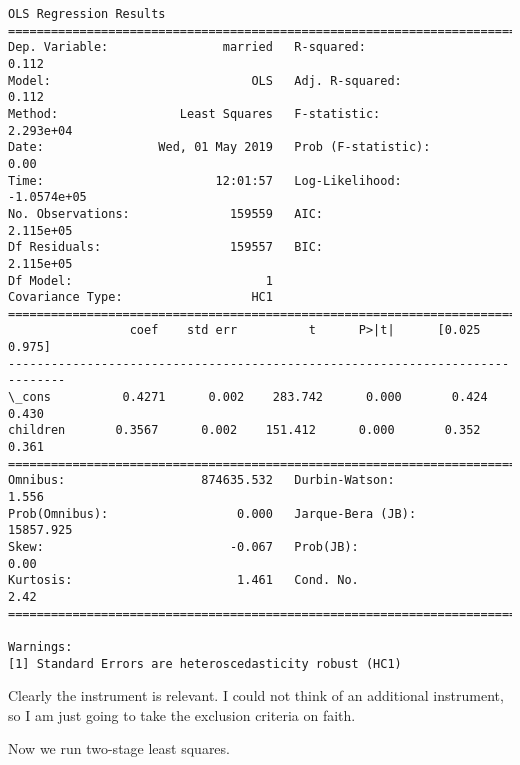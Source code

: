 \documentclass[11pt]{article}
\begin{document}
    \begin{Verbatim}[commandchars=\\\{\}]
                            OLS Regression Results                            
==============================================================================
Dep. Variable:                married   R-squared:                       0.112
Model:                            OLS   Adj. R-squared:                  0.112
Method:                 Least Squares   F-statistic:                 2.293e+04
Date:                Wed, 01 May 2019   Prob (F-statistic):               0.00
Time:                        12:01:57   Log-Likelihood:            -1.0574e+05
No. Observations:              159559   AIC:                         2.115e+05
Df Residuals:                  159557   BIC:                         2.115e+05
Df Model:                           1                                         
Covariance Type:                  HC1                                         
==============================================================================
                 coef    std err          t      P>|t|      [0.025      0.975]
------------------------------------------------------------------------------
\_cons          0.4271      0.002    283.742      0.000       0.424       0.430
children       0.3567      0.002    151.412      0.000       0.352       0.361
==============================================================================
Omnibus:                   874635.532   Durbin-Watson:                   1.556
Prob(Omnibus):                  0.000   Jarque-Bera (JB):            15857.925
Skew:                          -0.067   Prob(JB):                         0.00
Kurtosis:                       1.461   Cond. No.                         2.42
==============================================================================

Warnings:
[1] Standard Errors are heteroscedasticity robust (HC1)

    \end{Verbatim}

    Clearly the instrument is relevant. I could not think of an additional
instrument, so I am just going to take the exclusion criteria on faith.

Now we run two-stage least squares.
\end{document}
